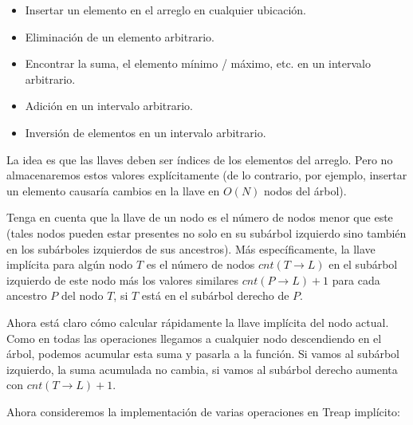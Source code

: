 \documentclass[12pt]{article}
\newcommand{\nl}{\vspace{0.3cm}}
\begin{document}
\begin{itemize}
	\item Insertar un elemento en el arreglo en cualquier ubicación.
	\item Eliminación de un elemento arbitrario.
	\item Encontrar la suma, el elemento mínimo / máximo, etc. en un intervalo arbitrario.
	\item Adición en un intervalo arbitrario.
	\item Inversión de elementos en un intervalo arbitrario.
\end{itemize}

La idea es que las llaves deben ser índices de los elementos del arreglo. Pero no almacenaremos estos valores explícitamente (de lo contrario, por ejemplo, insertar un elemento causaría cambios en la llave en $O(N)$ nodos del árbol).

\nl

Tenga en cuenta que la llave de un nodo es el número de nodos menor que este (tales nodos pueden estar presentes no solo en su subárbol izquierdo sino también en los subárboles izquierdos de sus ancestros). Más específicamente, la llave implícita para algún nodo $T$ es el número de nodos $cnt(T \rightarrow L)$ en el subárbol izquierdo de este nodo más los valores similares $cnt(P \rightarrow L) + 1$ para cada ancestro $P$ del nodo $T$, si $T$ está en el subárbol derecho de $P$.

\nl

Ahora está claro cómo calcular rápidamente la llave implícita del nodo actual. Como en todas las operaciones llegamos a cualquier nodo descendiendo en el árbol, podemos acumular esta suma y pasarla a la función. Si vamos al subárbol izquierdo, la suma acumulada no cambia, si vamos al subárbol derecho aumenta con $cnt(T \rightarrow L) + 1$.

\nl

Ahora consideremos la implementación de varias operaciones en Treap implícito:

\nl
\end{document}
